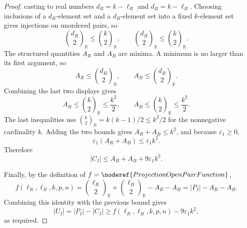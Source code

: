 \begin{proof}
casting to real numbers \(d_R=k-\ell_R\) and \(d_B=k-\ell_B\).  Choosing
inclusions of a \(d_R\)-element set and a \(d_B\)-element set into a fixed
\(k\)-element set gives injections on unordered pairs, so
\[
\binom{d_R}{2}_{\mathbb R}\le \binom{k}{2}_{\mathbb R},
\qquad
\binom{d_B}{2}_{\mathbb R}\le \binom{k}{2}_{\mathbb R}.
\]
The structured quantities \(A_R\) and \(A_B\) are minima.  A minimum is no
larger than its first argument, so
\[
A_R\le \binom{d_R}{2}_{\mathbb R},\qquad
A_B\le \binom{d_B}{2}_{\mathbb R}.
\]
Combining the last two displays gives
\[
A_R\le \binom{k}{2}_{\mathbb R}\le \frac{k^2}{2},
\qquad
A_B\le \binom{k}{2}_{\mathbb R}\le \frac{k^2}{2}.
\]
The last inequalities use
\(\binom{k}{2}_{\mathbb R}=k(k-1)/2\le k^2/2\) for the nonnegative
cardinality \(k\).  Adding the two bounds gives \(A_R+A_B\le k^2\), and
because \(\varepsilon_1\ge0\),
\[
\varepsilon_1(A_R+A_B)\le \varepsilon_1k^2.
\]
Therefore
\[
|C_I|\le A_R+A_B+9\varepsilon_1k^2.
\]

Finally, by the definition of \(f=\noderef{ProjectionOpenPairFunction}\),
\[
f(\ell_R,\ell_B,k,p,n)
=\binom{\ell_R}{2}_{\mathbb R}+\binom{\ell_B}{2}_{\mathbb R}-A_R-A_B
=|P_I|-A_R-A_B.
\]
Combining this identity with the previous bound gives
\[
|U_I|
=|P_I|-|C_I|
\ge f(\ell_R,\ell_B,k,p,n)-9\varepsilon_1k^2,
\]
as required.
\end{proof}
